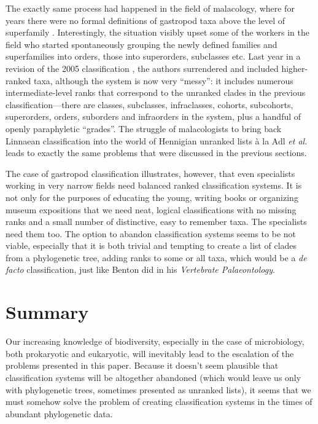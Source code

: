 \begin{artengenv}
The exactly same process had happened in the field of malacology, where for years there were no formal definitions of
gastropod taxa above the level of superfamily
\parencite[see][]{bouchet_classification_2005}.
Interestingly,
the situation visibly upset some of the workers in the field who started spontaneously grouping the newly defined
families and superfamilies into orders, those into superorders, subclasses etc. Last year in a revision of the 2005
classification
\parencite{bouchet_revised_2017},
the authors surrendered and included higher-ranked
taxa, although the system is now very ``messy'': it includes numerous intermediate-level ranks that correspond to the
unranked clades in the previous classification---there are classes, subclasses, infraclasses, cohorts, subcohorts,
superorders, orders, suborders and infraorders in the system, plus a handful of openly paraphyletic ``grades''. The
struggle of malacologists to bring back Linnaean classification into the world of Hennigian unranked lists à la Adl
\textit{et al.} leads to exactly the same problems that were discussed in the previous sections.

The case of gastropod classification illustrates, however, that even specialists working in very narrow fields need
balanced ranked classification systems. It is not only for the purposes of educating the young, writing books or
organizing museum expositions that we need neat, logical classifications with no missing ranks and a small number of
distinctive, easy to remember taxa. The specialists need them too. The option to abandon classification systems seems
to be not viable, especially that it is both trivial and tempting to create a list of clades from a phylogenetic tree,
adding ranks to some or all taxa, which would be a \textit{de facto} classification, just like Benton did in his
\textit{Vertebrate Palaeontology}.

\section{Summary}

Our increasing knowledge of biodiversity, especially in the case of microbiology, both prokaryotic and eukaryotic, will
inevitably lead to the escalation of the problems presented in this paper. Because it doesn’t seem plausible that
classification systems will be altogether abandoned (which would leave us only with phylogenetic trees, sometimes
presented as unranked lists), it seems that we must somehow solve the problem of creating classification systems in the
times of abundant phylogenetic data.


\end{artengenv}
